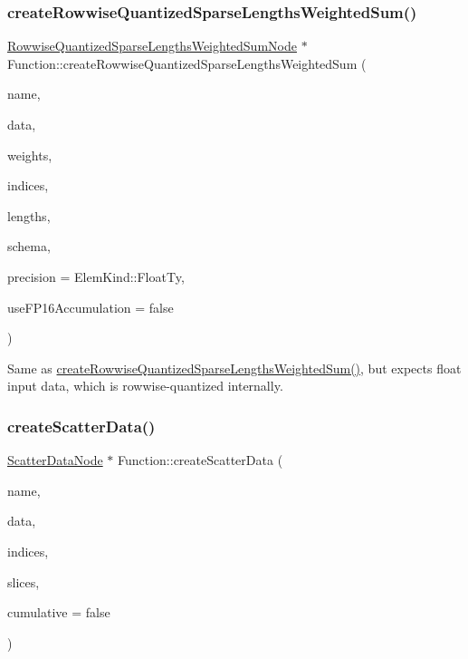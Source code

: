 \subsubsection{\texorpdfstring{create\+Rowwise\+Quantized\+Sparse\+Lengths\+Weighted\+Sum()}{createRowwiseQuantizedSparseLengthsWeightedSum()}\hspace{0.1cm}{\footnotesize\ttfamily [2/2]}}
{\footnotesize\ttfamily \hyperlink{classglow_1_1_rowwise_quantized_sparse_lengths_weighted_sum_node}{Rowwise\+Quantized\+Sparse\+Lengths\+Weighted\+Sum\+Node} $\ast$ Function\+::create\+Rowwise\+Quantized\+Sparse\+Lengths\+Weighted\+Sum (\begin{DoxyParamCaption}\item[{llvm\+::\+String\+Ref}]{name,  }\item[{\hyperlink{classglow_1_1_tensor}{Tensor} \&}]{data,  }\item[{\hyperlink{structglow_1_1_node_value}{Node\+Value}}]{weights,  }\item[{\hyperlink{structglow_1_1_node_value}{Node\+Value}}]{indices,  }\item[{\hyperlink{structglow_1_1_node_value}{Node\+Value}}]{lengths,  }\item[{quantization\+::\+Schema}]{schema,  }\item[{\hyperlink{namespaceglow_ab92e14a94329daf4083db670e95fbcdf}{Elem\+Kind}}]{precision = {\ttfamily ElemKind\+:\+:FloatTy},  }\item[{bool}]{use\+F\+P16\+Accumulation = {\ttfamily false} }\end{DoxyParamCaption})}

Same as \hyperlink{classglow_1_1_function_ae17510e67747d910c5ba7999ff498ea5}{create\+Rowwise\+Quantized\+Sparse\+Lengths\+Weighted\+Sum()}, but expects float input {\ttfamily data}, which is rowwise-\/quantized internally. \mbox{\label{classglow_1_1_function_acbe25057f5bb26ea1011b44b8815d6c9}} 
\subsubsection{\texorpdfstring{create\+Scatter\+Data()}{createScatterData()}}
{\footnotesize\ttfamily \hyperlink{classglow_1_1_scatter_data_node}{Scatter\+Data\+Node} $\ast$ Function\+::create\+Scatter\+Data (\begin{DoxyParamCaption}\item[{llvm\+::\+String\+Ref}]{name,  }\item[{\hyperlink{structglow_1_1_node_value}{Node\+Value}}]{data,  }\item[{\hyperlink{structglow_1_1_node_value}{Node\+Value}}]{indices,  }\item[{\hyperlink{structglow_1_1_node_value}{Node\+Value}}]{slices,  }\item[{bool}]{cumulative = {\ttfamily false} }\end{DoxyParamCaption})}

